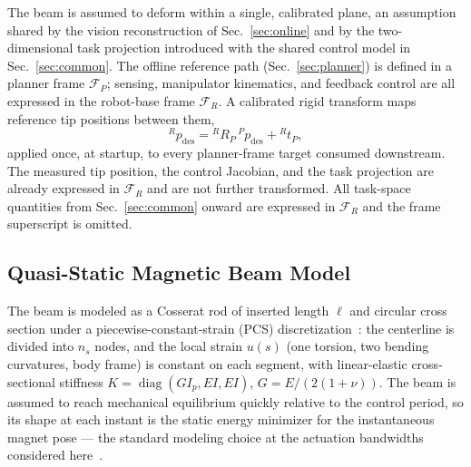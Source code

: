 \documentclass[journal]{IEEEtran}
\begin{document}
The beam is assumed to deform within a single, calibrated plane, an
assumption shared by the vision reconstruction of Sec.~\ref{sec:online}
and by the two-dimensional task projection introduced with the shared
control model in Sec.~\ref{sec:common}. The offline reference path
(Sec.~\ref{sec:planner}) is defined in a planner frame $\mathcal F_P$;
sensing, manipulator kinematics, and feedback control are all expressed
in the robot-base frame $\mathcal F_R$. A calibrated rigid transform maps
reference tip positions between them,
\begin{equation}
{}^{R}p_{\mathrm{des}} = {}^{R}R_P\,{}^{P}p_{\mathrm{des}} + {}^{R}t_P,
\label{eq:frame-fit}
\end{equation}
applied once, at startup, to every planner-frame target consumed
downstream. The measured tip position, the control Jacobian, and the task
projection are already expressed in $\mathcal F_R$ and are not further
transformed. All task-space quantities from Sec.~\ref{sec:common} onward
are expressed in $\mathcal F_R$ and the frame superscript is omitted.

\subsection{Quasi-Static Magnetic Beam Model}
\label{sec:beam-model}

The beam is modeled as a Cosserat rod of inserted length $\ell$ and
circular cross section under a piecewise-constant-strain (PCS)
discretization~\cite{rucker2010geometrically,renda2018discrete}: the
centerline is divided into $n_s$ nodes, and the local strain $u(s)$ (one
torsion, two bending curvatures, body frame) is constant on each segment,
with linear-elastic cross-sectional stiffness
$K=\operatorname{diag}(GI_p,EI,EI)$, $G=E/(2(1+\nu))$. The beam is assumed
to reach mechanical equilibrium quickly relative to the control period, so
its shape at each instant is the static energy minimizer for the
instantaneous magnet pose --- the standard modeling choice at the
actuation bandwidths considered
here~\cite{kratchman2017guiding,wu2025closedloop}.
\end{document}
